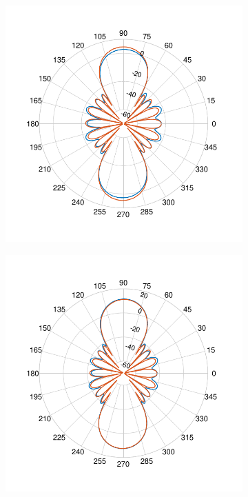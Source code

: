 \documentclass[10pt,a4paper,twocolumn]{article}
\begin{document}
{\begin{figure}[b!]
	\begin{subfigure}{0.25\linewidth}
		\includegraphics[scale=0.5]{pcb_pifa_array_azimuth_90_comparison.pdf}
		\caption{}
	\end{subfigure}
	\begin{subfigure}{0.25\linewidth}
		\includegraphics[scale=0.5]{pcb_pifa_array_elevation_90_comparison.pdf}
		\caption{}
	\end{subfigure}
	

\end{figure}}
\end{document}
